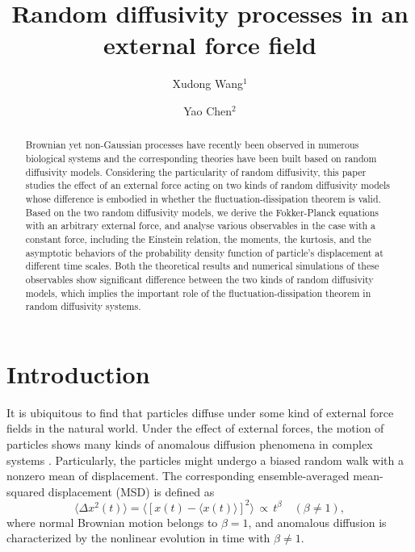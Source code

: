 \documentclass[aps,pre,twocolumn,groupedaddress,longbibliography]{revtex4-2}
\begin{document}
\title{Random diffusivity processes in an external force field}
\author{Xudong Wang$^1$}
\author{Yao Chen$^2$}


\begin{abstract}
Brownian yet non-Gaussian processes have recently been observed in numerous biological systems and the corresponding theories have been built based on random diffusivity models. Considering the particularity of random diffusivity, this paper studies the effect of an external force acting on two kinds of random diffusivity models whose difference is embodied in whether the fluctuation-dissipation theorem is valid. Based on the two random diffusivity models, we derive the Fokker-Planck equations with an arbitrary external force, and analyse various observables in the case with a constant force, including the Einstein relation, the moments, the kurtosis, and the asymptotic behaviors of the probability density function of particle's displacement at different time scales.
Both the theoretical results and numerical simulations of these observables show significant difference between the two kinds of random diffusivity models, which implies the important role of the fluctuation-dissipation theorem in random diffusivity systems.

\end{abstract}


\maketitle

\section{Introduction}\label{Sec1}
It is ubiquitous to find that particles diffuse under some kind of external force fields in the natural world. Under the effect of external forces, the motion of particles shows many kinds of anomalous diffusion phenomena in complex systems \cite{BouchaudGeorges:1990,MetzlerKlafter:2000,MagdziarzWeronKlafter:2008,EuleFriedrich:2009,CairoliBaule:2015,FedotovKorabel:2015}.
Particularly, the particles might undergo a biased random walk with a nonzero mean of displacement. The corresponding ensemble-averaged mean-squared displacement (MSD) is defined as
\begin{equation}\label{1}
\langle \Delta x^2(t)\rangle=\langle[x(t)-\langle x(t)\rangle]^2\rangle \,{\propto}\,t^\beta  \quad  (\beta\neq1),
\end{equation}
where normal Brownian motion belongs to $\beta=1$, and anomalous diffusion is characterized by the nonlinear evolution in time with $\beta\neq1$.
\end{document}
